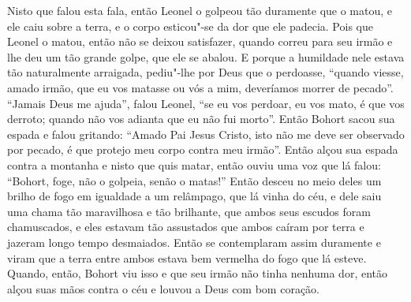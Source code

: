Nisto que falou esta fala, então Leonel o golpeou tão duramente que o matou, e
ele caiu sobre a terra, e o corpo esticou"-se da dor que ele padecia. Pois que
Leonel o matou, então não se deixou satisfazer, quando correu para seu irmão e
lhe deu um tão grande golpe, que ele se abalou. E porque a humildade nele
estava tão naturalmente arraigada, pediu"-lhe por Deus que o perdoasse, “quando
viesse, amado irmão, que eu vos matasse ou vós a mim, deveríamos morrer de
pecado”. “Jamais Deus me ajuda”, falou Leonel, “se eu vos perdoar, eu vos mato,
é que vos derroto; quando não vos adianta que eu não fui morto”. Então Bohort
sacou sua espada e falou gritando: “Amado Pai Jesus Cristo, isto não me deve
ser observado por pecado, é que protejo meu corpo contra meu irmão”. Então
alçou sua espada contra a montanha e nisto que quis matar, então ouviu uma voz
que lá falou: “Bohort, foge, não o golpeia, senão o matas!” Então desceu no
meio deles um brilho de fogo em igualdade a um relâmpago, que lá vinha do céu,
e dele saiu uma chama tão maravilhosa e tão brilhante, que ambos seus escudos
foram chamuscados, e eles estavam tão assustados que ambos caíram por terra e
jazeram longo tempo desmaiados. Então se contemplaram assim
duramente e viram que a terra entre ambos estava bem vermelha do fogo que lá
esteve. Quando, então, Bohort viu isso e que seu irmão não tinha nenhuma dor,
então alçou suas mãos contra o céu e louvou a Deus com bom coração. 

